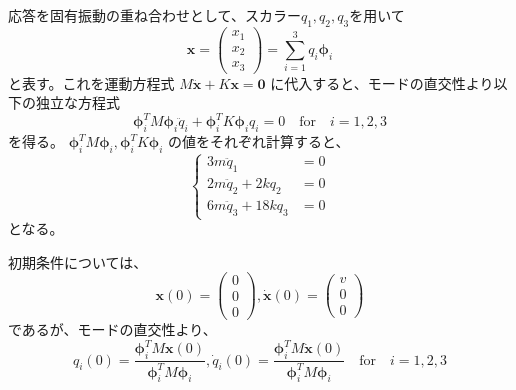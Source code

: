 \documentclass[a4paper]{jsarticle}
\begin{document}
\subsection{}
応答を固有振動の重ね合わせとして、スカラー$q_1, q_2, q_3$を用いて
\begin{equation}
  \boldsymbol{x} =
  \begin{pmatrix}
    x_1 \\ x_2 \\ x_3
  \end{pmatrix} =
  \sum_{i = 1}^3 q_i \boldsymbol{\phi}_i
\end{equation}
と表す。これを運動方程式
$M \ddot{\boldsymbol{x}} + K \boldsymbol{x} = \boldsymbol{0}$
に代入すると、モードの直交性より以下の独立な方程式
\begin{equation}
  \boldsymbol{\phi}_i^T M \boldsymbol{\phi}_i \ddot{q}_i +
  \boldsymbol{\phi}_i^T K \boldsymbol{\phi}_i q_i = 0
  \quad \mathrm{for} \quad i = 1, 2, 3
\end{equation}
を得る。
$\boldsymbol{\phi}_i^T M \boldsymbol{\phi}_i, \boldsymbol{\phi}_i^T K \boldsymbol{\phi}_i$
の値をそれぞれ計算すると、
\begin{equation}
  \begin{cases}
    3 m \ddot{q}_1 &= 0 \\
    2 m \ddot{q}_2 + 2 k q_2 &= 0 \\
    6 m \ddot{q}_3 + 18 k q_3 &= 0
  \end{cases}
\end{equation}
となる。\par
初期条件については、
\begin{equation}
  \boldsymbol{x}(0) =
  \begin{pmatrix}
    0 \\ 0 \\ 0
  \end{pmatrix},
  \boldsymbol{\dot{x}}(0) =
  \begin{pmatrix}
    v \\ 0 \\ 0
  \end{pmatrix}
\end{equation}
であるが、モードの直交性より、
\begin{equation}
  q_i(0) = \frac{\boldsymbol{\phi}_i^T M \boldsymbol{x}(0)}{\boldsymbol{\phi}_i^T M \boldsymbol{\phi}_i},
  \dot{q}_i(0) = \frac{\boldsymbol{\phi}_i^T M \boldsymbol{\dot{x}}(0)}{\boldsymbol{\phi}_i^T M \boldsymbol{\phi}_i}
  \quad \mathrm{for} \quad i = 1, 2, 3
\end{equation}
\end{document}

